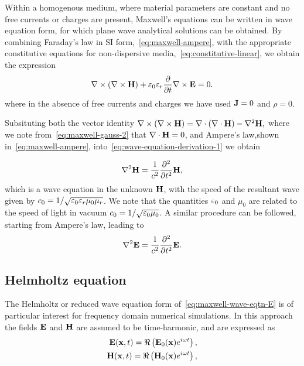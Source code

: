 Within a homogenous medium, where material parameters are constant and no free
currents or charges are present, Maxwell's equations can be written in wave
equation form, for which plane wave analytical solutions can be
obtained\cite{Jackson:490457}. By combining Faraday's law in SI
form,~\eqref{eq:maxwell-ampere}, with the appropriate constitutive equations for
non-dispersive media,~\eqref{eq:constitutive-linear}, we obtain the expression
\begin{equation}
  \label{eq:wave-equation-derivation-1}
  \nabla \times ( \nabla \times \mathbf{H} ) + \varepsilon_0 \varepsilon_r \frac{\partial}{\partial t}  \nabla \times \mathbf{E} = 0 .
\end{equation}
where in the absence of free currents and charges we have used $\mathbf{J} = 0$ and
$\rho = 0$.

Subsituting both the vector identity $ \nabla \times ( \nabla \times \mathbf{H} ) =
\nabla \cdot ( \nabla \cdot \mathbf{H} ) - \nabla^2 \mathbf{H}, $ where we note
from~\eqref{eq:maxwell-gauss-2} that $\nabla \cdot \mathbf{H} = 0$, and Ampere's
law,shown in~\eqref{eq:maxwell-ampere},
into~\eqref{eq:wave-equation-derivation-1} we obtain

\begin{equation}
  \label{eq:maxwell-wave-eqtn-H}
  \nabla^2 \mathbf{H} = \frac{1}{c^2} \frac{\partial^2}{\partial t^2}{ \mathbf{H} },
\end{equation}
which is a wave equation in the unknown $\mathbf{H}$, with the speed of the resultant
wave given by $c_0 = 1/\sqrt{\varepsilon_0 \varepsilon_r \mu_0 \mu_r }$. We note that the
quantities $\varepsilon_0$ and $\mu_0$ are related to the speed of light in vacuum $c_0
= 1/\sqrt{\varepsilon_0 \mu_0 }$. A similar procedure can be followed, starting from
Ampere's law, leading to
\begin{equation}
  \label{eq:maxwell-wave-eqtn-E}
  \nabla^2 \mathbf{E} = \frac{1}{c^2} \frac{\partial^2}{\partial t^2}{ \mathbf{E} } .
\end{equation}

\subsection{Helmholtz equation}
The Helmholtz or reduced wave equation form of~\eqref{eq:maxwell-wave-eqtn-E} is
of particular interest for frequency domain numerical simulations. In this
approach the fields $\mathbf{E}$ and $\mathbf{H}$ are assumed to be time-harmonic, and are
expressed as
\begin{align}
  \label{eq:maxwell-helmholtz-time-harmonic}
  \mathbf{E}(\mathbf{x},t) = \Re \left( \mathbf{E}_0(\mathbf{x}) e^{i \omega t} \right), \\
  \mathbf{H}(\mathbf{x},t) = \Re \left( \mathbf{H}_0(\mathbf{x}) e^{i \omega t} \right),
\end{align}

